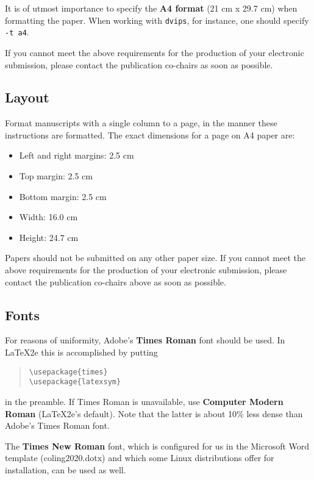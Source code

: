 \documentclass[11pt]{article}
\begin{document}
It is of utmost importance to specify the \textbf{A4 format} (21 cm
x 29.7 cm) when formatting the paper. When working with
{\tt dvips}, for instance, one should specify {\tt -t a4}.

If you cannot meet the above requirements
for the
production of your electronic submission, please contact the
publication co-chairs as soon as possible.


\subsection{Layout}
\label{ssec:layout}

Format manuscripts with a single column to a page, in the manner these
instructions are formatted. The exact dimensions for a page on A4
paper are:

\begin{itemize}
\item Left and right margins: 2.5 cm
\item Top margin: 2.5 cm
\item Bottom margin: 2.5 cm
\item Width: 16.0 cm
\item Height: 24.7 cm
\end{itemize}

\noindent Papers should not be submitted on any other paper size.
If you cannot meet the above requirements for
the production of your electronic submission, please contact the
publication co-chairs above as soon as possible.


\subsection{Fonts}

For reasons of uniformity, Adobe's {\bf Times Roman} font should be
used. In \LaTeX2e{} this is accomplished by putting

\begin{quote}
\begin{verbatim}
\usepackage{times}
\usepackage{latexsym}
\end{verbatim}
\end{quote}
in the preamble. If Times Roman is unavailable, use {\bf Computer
  Modern Roman} (\LaTeX2e{}'s default).  Note that the latter is about
  10\% less dense than Adobe's Times Roman font.

The {\bf Times New Roman} font, which is configured for us in the
Microsoft Word template (coling2020.dotx) and which some Linux
distributions offer for installation, can be used as well.
\end{document}
